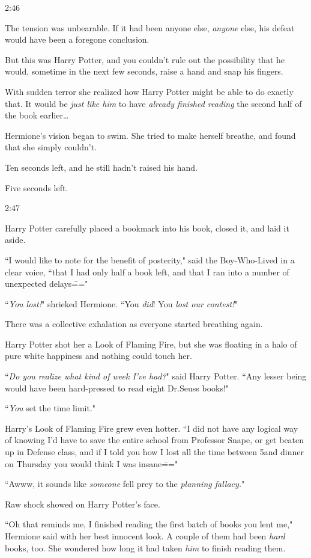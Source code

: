 2:46\pm

The tension was unbearable. If it had been anyone else, \emph{anyone} else, his defeat would have been a foregone conclusion.

But this was Harry Potter, and you couldn't rule out the possibility that he would, sometime in the next few seconds, raise a hand and snap his fingers.

With sudden terror she realized how Harry Potter might be able to do exactly that. It would be \emph{just like him} to have \emph{already finished reading} the second half of the book earlier{\ldots}

Hermione's vision began to swim. She tried to make herself breathe, and found that she simply couldn't.

Ten seconds left, and he still hadn't raised his hand.

Five seconds left.

2:47\pm

Harry Potter carefully placed a bookmark into his book, closed it, and laid it aside.

``I would like to note for the benefit of posterity," said the Boy-Who-Lived in a clear voice, ``that I had only half a book left, and that I ran into a number of unexpected delays\==="

``\emph{You lost!}" shrieked Hermione. ``You \emph{did}! You \emph{lost our contest!}"

There was a collective exhalation as everyone started breathing again.

Harry Potter shot her a Look of Flaming Fire, but she was floating in a halo of pure white happiness and nothing could touch her.

``\emph{Do you realize what kind of week I've had?}" said Harry Potter. ``Any lesser being would have been hard-pressed to read eight Dr.\?Seuss books!"

``\emph{You} set the time limit."

Harry's Look of Flaming Fire grew even hotter. ``I did not have any logical way of knowing I'd have to save the entire school from Professor Snape, or get beaten up in Defense class, and if I told you how I lost all the time between 5\pm and dinner on Thursday you would think I was insane\==="

``Awww, it sounds like \emph{someone} fell prey to the \emph{planning fallacy.}"

Raw shock showed on Harry Potter's face.

``Oh that reminds me, I finished reading the first batch of books you lent me," Hermione said with her best innocent look. A couple of them had been \emph{hard} books, too. She wondered how long it had taken \emph{him} to finish reading them.

